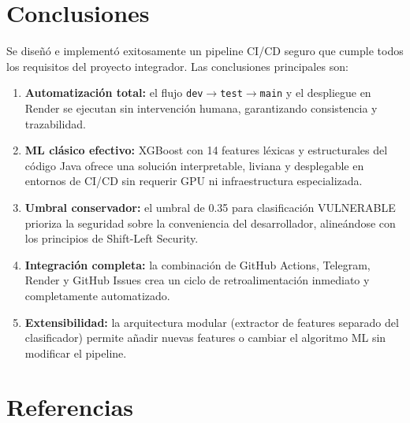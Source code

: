 \documentclass[12pt,a4paper]{article}
\begin{document}
\section{Conclusiones}

Se diseñó e implementó exitosamente un pipeline CI/CD seguro que cumple todos los requisitos del proyecto integrador. Las conclusiones principales son:

\begin{enumerate}
  \item \textbf{Automatización total:} el flujo \texttt{dev}$\to$\texttt{test}$\to$\texttt{main} y el despliegue en Render se ejecutan sin intervención humana, garantizando consistencia y trazabilidad.
  \item \textbf{ML clásico efectivo:} XGBoost con 14 features léxicas y estructurales del código Java ofrece una solución interpretable, liviana y desplegable en entornos de CI/CD sin requerir GPU ni infraestructura especializada.
  \item \textbf{Umbral conservador:} el umbral de 0.35 para clasificación VULNERABLE prioriza la seguridad sobre la conveniencia del desarrollador, alineándose con los principios de Shift-Left Security.
  \item \textbf{Integración completa:} la combinación de GitHub Actions, Telegram, Render y GitHub Issues crea un ciclo de retroalimentación inmediato y completamente automatizado.
  \item \textbf{Extensibilidad:} la arquitectura modular (extractor de features separado del clasificador) permite añadir nuevas features o cambiar el algoritmo ML sin modificar el pipeline.
\end{enumerate}

\section*{Referencias}
\end{document}
